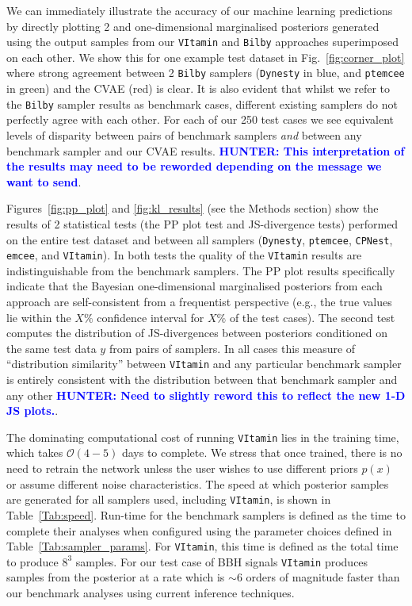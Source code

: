 \documentclass[%
showpacs,
nofootinbib,
 amsmath,amssymb,
 aps,
 twocolumn,
 prl,
 reprint,
floatfix,
]{revtex4-1}
\newcommand{\hunter}[1]{\textbf{\textcolor{blue}{HUNTER: #1}}}
\begin{document}
%
%
We can immediately illustrate the accuracy of our machine learning predictions
by directly plotting 2 and one-dimensional marginalised posteriors generated
using the output samples from our \texttt{VItamin} and \texttt{Bilby}
approaches superimposed on each other. We show this for one example test
dataset in Fig.~\ref{fig:corner_plot} where strong agreement between 2
\texttt{Bilby} samplers (\texttt{Dynesty} in blue, and \texttt{ptemcee} in green) and the
\ac{CVAE} (red) is clear. It is also evident that whilst we refer to the
\texttt{Bilby} sampler results as benchmark cases, different existing samplers
do not perfectly agree with each other. For each of our 250 test cases we see
equivalent levels of disparity between pairs of benchmark samplers \emph{and}
between any benchmark sampler and our \ac{CVAE} results.  \hunter{This interpretation 
of the results may need to be reworded depending on the message we want 
to send}.

%
%
Figures~\ref{fig:pp_plot} and \ref{fig:kl_results} (see the Methods section)
show the results of 2 statistical tests (the \ac{PP} plot test and
\ac{JS}-divergence tests) performed on the entire test dataset and between all
samplers (\texttt{Dynesty}, \texttt{ptemcee}, \texttt{CPNest}, \texttt{emcee}, and \texttt{VItamin}). In
both tests the quality of the \texttt{VItamin} results are indistinguishable from the
benchmark samplers. The \ac{PP} plot results specifically indicate that the
Bayesian one-dimensional marginalised posteriors from each approach are
self-consistent from a frequentist perspective (e.g., the true values lie
within the $X\%$ confidence interval for $X\%$ of the test cases). The second
test computes the distribution of \ac{JS}-divergences between posteriors
conditioned on the same test data $y$ from pairs of samplers. In all cases this
measure of ``distribution similarity'' between \texttt{VItamin} and any particular
benchmark sampler is entirely consistent with the distribution between that
benchmark sampler and any other \hunter{Need to slightly reword this 
to reflect the new 1-D JS plots.}.

%
%
The dominating computational cost of running \texttt{VItamin} lies in the
training time, which takes $\mathcal{O}(4-5)$ days to complete. We
stress that once trained, there is no need to retrain the network unless the
user wishes to use different priors $p(x)$ or assume different noise
characteristics. The speed at which posterior samples are generated for all
samplers used, including \texttt{VItamin}, is shown in Table~\ref{Tab:speed}.
Run-time for the benchmark samplers is defined as the time to complete their
analyses when configured using the parameter choices defined in
Table~\ref{Tab:sampler_params}. For \texttt{VItamin}, this time is defined as
the total time to produce $8^3$ samples. For our test case of \ac{BBH} signals
\texttt{VItamin} produces samples from the posterior at a rate which is $\sim
6$ orders of magnitude faster than our benchmark analyses using current
inference techniques. 
\end{document}
